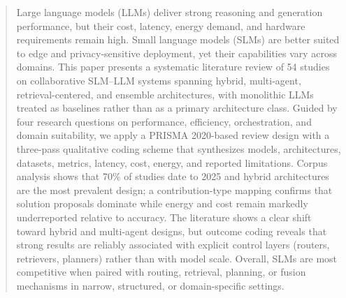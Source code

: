 \begin{abstract}
Large language models (LLMs) deliver strong reasoning and generation performance, but their cost, latency, energy demand, and hardware requirements remain high. Small language models (SLMs) are better suited to edge and privacy-sensitive deployment, yet their capabilities vary across domains. This paper presents a systematic literature review of 54 studies on collaborative SLM--LLM systems spanning hybrid, multi-agent, retrieval-centered, and ensemble architectures, with monolithic LLMs treated as baselines rather than as a primary architecture class. Guided by four research questions on performance, efficiency, orchestration, and domain suitability, we apply a PRISMA 2020-based review design with a three-pass qualitative coding scheme that synthesizes models, architectures, datasets, metrics, latency, cost, energy, and reported limitations. Corpus analysis shows that 70\% of studies date to 2025 and hybrid architectures are the most prevalent design; a contribution-type mapping confirms that solution proposals dominate while energy and cost remain markedly underreported relative to accuracy. The literature shows a clear shift toward hybrid and multi-agent designs, but outcome coding reveals that strong results are reliably associated with explicit control layers (routers, retrievers, planners) rather than with model scale. Overall, SLMs are most competitive when paired with routing, retrieval, planning, or fusion mechanisms in narrow, structured, or domain-specific settings.

\end{abstract}
